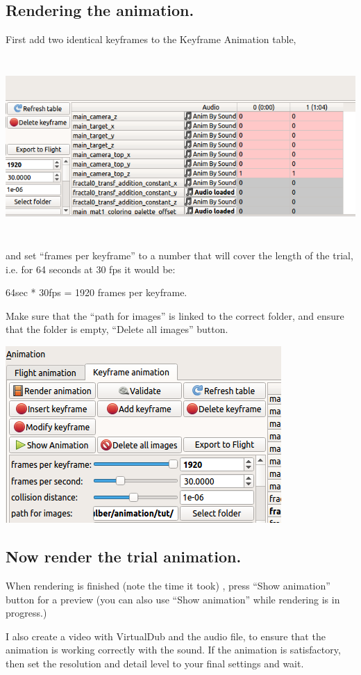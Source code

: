 \subsection{Rendering the animation.}\label{rendering-the-animation.}

First add two identical keyframes to the Keyframe Animation table,

\includegraphics[width=6.69291in,height=2.69291in]{img/sound/media/image9.png}

and set ``frames per keyframe'' to a number that will cover the length
of the trial, i.e. for 64 seconds at 30 fps it would be:

64sec * 30fps = 1920 frames per keyframe.

Make sure that the ``path for images'' is linked to the correct folder,
and ensure that the folder is empty, ``Delete all images'' button.

\includegraphics[width=4.14000in,height=2.65000in]{img/sound/media/image10.png}

\subsection{Now render the trial
animation.}\label{now-render-the-trial-animation.}

When rendering is finished (note the time it took) , press ``Show
animation'' button for a preview (you can also use ``Show animation''
while rendering is in progress.)

I also create a video with VirtualDub and the audio file, to ensure that
the animation is working correctly with the sound. If the animation is
satisfactory, then set the resolution and detail level to your final
settings and wait.
